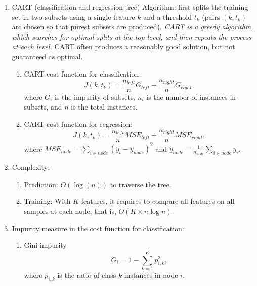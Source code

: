 \documentclass[12pt,oneside,a4paper]{article}
\numberwithin{equation}{section}
\newcommand{\wh}[1]{\widehat{#1}}
\begin{document}
\begin{enumerate}
\item CART (classification and regression tree) Algorithm: first splits the training set in two subsets using a single feature $k$ and a threshold $t_k$ (pairs $(k, t_k)$ are chosen so that purest subsets are produced). \emph{CART is a greedy algorithm, which searches for optimal splits at the top level, and then repeats the process at each level.} CART often produces a reasonably good solution, but not guaranteed as optimal.

\begin{enumerate}
\item CART cost function for classification: 
\begin{equation}
J(k, t_k) = \frac{n_{left}}{n} G_{left} + \frac{n_{right}}{n} G_{right},
\end{equation}
where $G_{i}$ is the impurity of subsets, $n_{i}$ is the number of instances in subsets, and $n$ is the total instances.

\item CART cost function for regression: 
\begin{equation}
J(k, t_k)= \frac{n_{left}}{n} MSE_{left} + \frac{n_{right}}{n} MSE_{right},
\end{equation}
where $MSE_{node} = \sum_{i \in node} (y_i - \wh{y}_{node})^2$ and $\wh{y}_{node} = \frac{1}{n_{node}}\sum_{i \in node} y_i$.
\end{enumerate}

\item Complexity:
\begin{enumerate}
\item Prediction: $O(\log(n))$ to traverse the tree.
\item Training: With $K$ features, it requires to compare all features on all samples at each node, that is, $O(K \times n \log n)$.
\end{enumerate}

\item Impurity measure in the cost function for classification: 
\begin{enumerate}
\item Gini impurity
\begin{equation}
G_i = 1 - \sum_{k=1}^{K} p_{i, k}^2,
\end{equation}
where $p_{i,k}$ is the ratio of class $k$ instances in node $i$.


\end{enumerate}
\end{enumerate}
\end{document}
